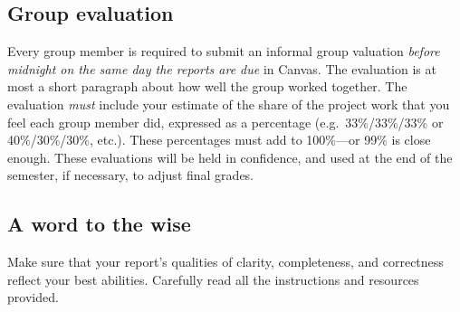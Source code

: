 \documentclass[11pt]{article}\usepackage[]{graphicx}\usepackage[]{color}
\begin{document}
\subsection*{Group evaluation}

Every group member is required to submit an informal group valuation
\emph{before midnight on the same day the reports are due} in Canvas. The
evaluation is at most a short paragraph about how well the group worked
together. The evaluation \emph{must} include your estimate of the share of the
project work that you feel each group member did, expressed as a percentage
(e.g.~33\%/33\%/33\% or 40\%/30\%/30\%, etc.). These percentages must add to
100\%---or 99\% is close enough. These evaluations will be held in confidence,
and used at the end of the semester, if necessary, to adjust final grades.

\subsection*{A word to the wise}

Make sure that your report's qualities of clarity, completeness, and
correctness reflect your best abilities. Carefully read all the instructions
and resources provided.
\end{document}
